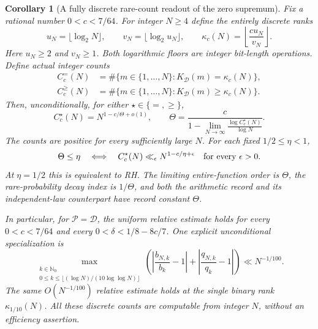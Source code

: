 \documentclass[11pt]{article}
\newtheorem{corollary}[theorem]{Corollary}
\theoremstyle{definition}
\begin{document}
\begin{corollary}[A fully discrete rare-count readout of the zero supremum]
\label{cor:greedy-discrete-rare-RH}
Fix a rational number $0<c<7/64$.
For integer $N\ge4$ define the entirely discrete ranks
\begin{equation}
 u_N=\lfloor\log_2N\rfloor,\qquad
 v_N=\lfloor\log_2u_N\rfloor,\qquad
 \kappa_c(N)=\left\lfloor\frac{c u_N}{v_N}\right\rfloor .
 \label{eq:greedy-binary-rank-selector}
\end{equation}
Here $u_N\ge2$ and $v_N\ge1$.
Both logarithmic floors are integer bit-length operations.
Define actual integer counts
\[
 \begin{aligned}
 C_c^=(N)&=\#\{m\in\{1,\ldots,N\}:
                     K_{\mathcal D}(m)=\kappa_c(N)\},\\
 C_c^{\ge}(N)&=\#\{m\in\{1,\ldots,N\}:
                     K_{\mathcal D}(m)\ge\kappa_c(N)\}.
 \end{aligned}
\]
Then, unconditionally, for either $\star\in\{=,\ge\}$,
\begin{equation}
 C_c^\star(N)=N^{1-c/\Theta+o(1)},\qquad
 \Theta=\frac{c}{
       1-\displaystyle\lim_{N\to\infty}
                        \frac{\log C_c^\star(N)}{\log N}} .
 \label{eq:greedy-rare-integer-counts}
\end{equation}
The counts are positive for every sufficiently large $N$.
For each fixed $1/2\le\eta<1$,
\begin{equation}
 \Theta\le\eta
 \quad\Longleftrightarrow\quad
 C_c^\star(N)\ll_\epsilon N^{1-c/\eta+\epsilon}
                         \quad\hbox{for every }\epsilon>0.
 \label{eq:greedy-rare-integer-strip}
\end{equation}
At $\eta=1/2$ this is equivalent to RH.
The limiting entire-function order is $\Theta$, the
rare-probability decay index is $1/\Theta$, and both the
arithmetic record and its independent-law counterpart have
record constant $\Theta$.

In particular, for $\mathcal P=\mathcal D$, the uniform
relative estimate holds for every
$0<c<7/64$ and every $0<\delta<1/8-8c/7$.
One explicit unconditional specialization is
\begin{equation}
 \max_{\substack{k\in\mathbb N_0\\
       0\le k\le\lfloor(\log N)/(10\log\log N)\rfloor}}
 \left(\left|\frac{b_{N,k}}{b_k}-1\right|
       +\left|\frac{q_{N,k}}{q_k}-1\right|\right)
                                  \ll N^{-1/100}.
 \label{eq:greedy-rare-one-tenth-budget}
\end{equation}
The same $O(N^{-1/100})$ relative estimate holds at the
single binary rank $\kappa_{1/10}(N)$.
All these discrete counts are computable from integer $N$,
without an efficiency assertion.
\end{corollary}
\end{document}
